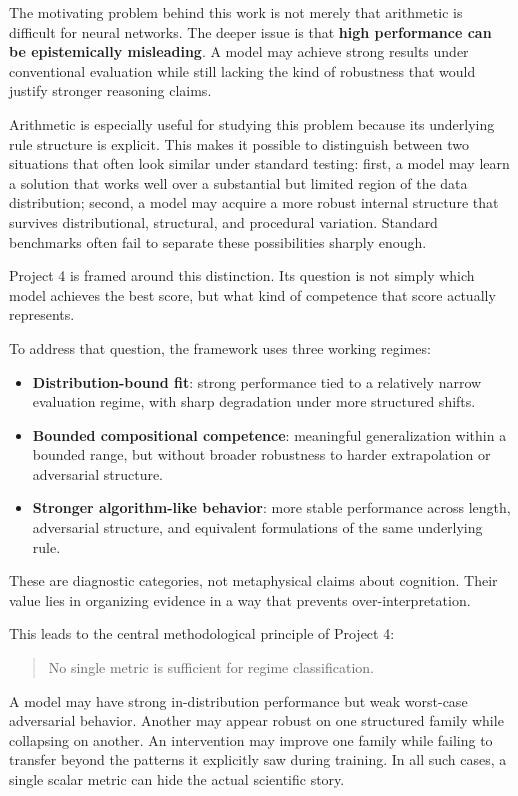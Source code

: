 \documentclass[11pt]{article}
\begin{document}
The motivating problem behind this work is not merely that arithmetic is difficult for neural networks. The deeper issue is that \textbf{high performance can be epistemically misleading}. A model may achieve strong results under conventional evaluation while still lacking the kind of robustness that would justify stronger reasoning claims.

Arithmetic is especially useful for studying this problem because its underlying rule structure is explicit. This makes it possible to distinguish between two situations that often look similar under standard testing: first, a model may learn a solution that works well over a substantial but limited region of the data distribution; second, a model may acquire a more robust internal structure that survives distributional, structural, and procedural variation. Standard benchmarks often fail to separate these possibilities sharply enough.

Project 4 is framed around this distinction. Its question is not simply which model achieves the best score, but what kind of competence that score actually represents.

To address that question, the framework uses three working regimes:
\begin{itemize}[leftmargin=1.5em]
    \item \textbf{Distribution-bound fit}: strong performance tied to a relatively narrow evaluation regime, with sharp degradation under more structured shifts.
    \item \textbf{Bounded compositional competence}: meaningful generalization within a bounded range, but without broader robustness to harder extrapolation or adversarial structure.
    \item \textbf{Stronger algorithm-like behavior}: more stable performance across length, adversarial structure, and equivalent formulations of the same underlying rule.
\end{itemize}

These are diagnostic categories, not metaphysical claims about cognition. Their value lies in organizing evidence in a way that prevents over-interpretation.

This leads to the central methodological principle of Project 4:

\begin{quote}
No single metric is sufficient for regime classification.
\end{quote}

A model may have strong in-distribution performance but weak worst-case adversarial behavior. Another may appear robust on one structured family while collapsing on another. An intervention may improve one family while failing to transfer beyond the patterns it explicitly saw during training. In all such cases, a single scalar metric can hide the actual scientific story.
\end{document}
